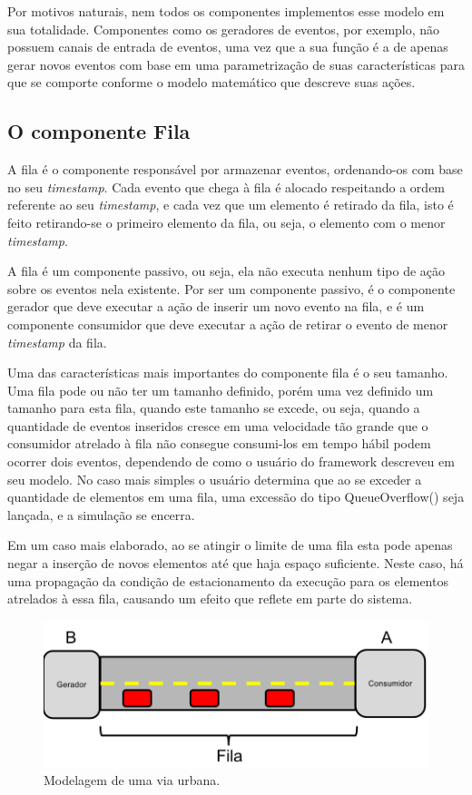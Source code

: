 Por motivos naturais, nem todos os componentes implementos esse modelo em sua totalidade. Componentes como os geradores de eventos, por exemplo, não possuem canais de entrada de eventos, uma vez que a sua função é a de apenas gerar novos eventos com base em uma parametrização de suas características para que se comporte conforme o modelo matemático que descreve suas ações. 

\subsection{O componente Fila}

A fila é o componente responsável por armazenar eventos, ordenando-os com base no seu \textit{timestamp}. Cada evento que chega à fila é alocado respeitando a ordem referente ao seu \textit{timestamp}, e cada vez que um elemento é retirado da fila, isto é feito retirando-se o primeiro elemento da fila, ou seja, o elemento com o menor \textit{timestamp}. 

A fila é um componente passivo, ou seja, ela não executa nenhum tipo de ação sobre os eventos nela existente. Por ser um componente passivo, é o componente gerador que deve executar a ação de inserir um novo evento na fila, e é um componente consumidor que deve executar a ação de retirar o evento de menor \textit{timestamp} da fila.

Uma das características mais importantes do componente fila é o seu tamanho. Uma fila pode ou não ter um tamanho definido, porém uma vez definido um tamanho para esta fila, quando este tamanho se excede, ou seja, quando a quantidade de eventos inseridos cresce em uma velocidade tão grande que o consumidor atrelado à fila não consegue consumi-los em tempo hábil podem ocorrer dois eventos, dependendo de como o usuário do framework descreveu em seu modelo. No caso mais simples o usuário determina que ao se exceder a quantidade de elementos em uma fila, uma excessão do tipo QueueOverflow() seja lançada, e a simulação se encerra.

Em um caso mais elaborado, ao se atingir o limite de uma fila esta pode apenas negar a inserção de novos elementos até que haja espaço suficiente. Neste caso, há uma propagação da condição de estacionamento da execução para os elementos atrelados à essa fila, causando um efeito que reflete em parte do sistema. 

\begin{figure}
  \centerline{\includegraphics{cruzamento.png}}
  \caption{Modelagem de uma via urbana.}
\label{fig:cruzamento}
\end{figure}

